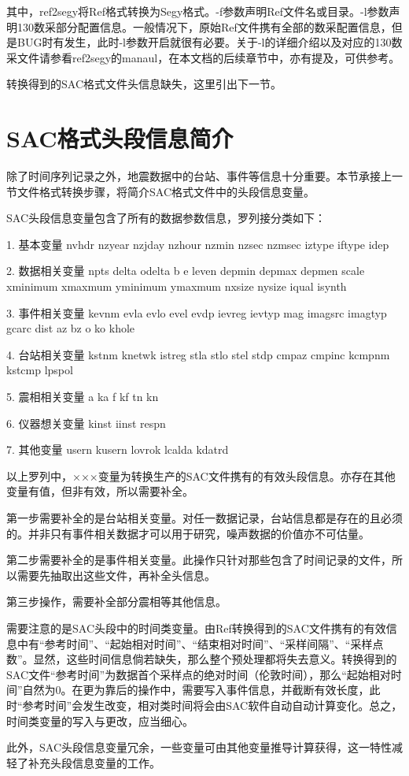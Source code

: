 \documentclass[a4paper]{article}
\begin{document}
其中，ref2segy将Ref格式转换为Segy格式。-f参数声明Ref文件名或目录。-l参数声明130数采部分配置信息。一般情况下，原始Ref文件携有全部的数采配置信息，但是BUG时有发生，此时-l参数开启就很有必要。关于-l的详细介绍以及对应的130数采文件请参看ref2segy的manaul，在本文档的后续章节中，亦有提及，可供参考。\par
转换得到的SAC格式文件头信息缺失，这里引出下一节。

\clearpage\section{SAC格式头段信息简介}
除了时间序列记录之外，地震数据中的台站、事件等信息十分重要。本节承接上一节文件格式转换步骤，将简介SAC格式文件中的头段信息变量。\par
SAC头段信息变量包含了所有的数据参数信息，罗列接分类如下：\par
1. 基本变量 nvhdr nzyear nzjday nzhour nzmin nzsec nzmsec iztype iftype idep\par
2. 数据相关变量 npts delta odelta b e leven depmin depmax depmen scale xminimum xmaxmum yminimum ymaxmum nxsize nysize iqual isynth\par
3. 事件相关变量 kevnm evla evlo evel evdp ievreg ievtyp mag imagsrc imagtyp gcarc dist az bz o ko khole\par
4. 台站相关变量 kstnm knetwk istreg stla stlo stel stdp cmpaz cmpinc kcmpnm kstcmp lpspol\par
5. 震相相关变量 a ka f kf tn kn\par
6. 仪器想关变量 kinst iinst respn\par
7. 其他变量 usern kusern lovrok lcalda kdatrd\par

以上罗列中，×××变量为转换生产的SAC文件携有的有效头段信息。亦存在其他变量有值，但非有效，所以需要补全。\par
第一步需要补全的是台站相关变量。对任一数据记录，台站信息都是存在的且必须的。并非只有事件相关数据才可以用于研究，噪声数据的价值亦不可估量。\par
第二步需要补全的是事件相关变量。此操作只针对那些包含了时间记录的文件，所以需要先抽取出这些文件，再补全头信息。\par
第三步操作，需要补全部分震相等其他信息。\par
需要注意的是SAC头段中的时间类变量。由Ref转换得到的SAC文件携有的有效信息中有“参考时间”、“起始相对时间”、“结束相对时间”、“采样间隔”、“采样点数”。显然，这些时间信息倘若缺失，那么整个预处理都将失去意义。转换得到的SAC文件“参考时间”为数据首个采样点的绝对时间（伦敦时间），那么“起始相对时间”自然为0。在更为靠后的操作中，需要写入事件信息，并截断有效长度，此时“参考时间”会发生改变，相对类时间将会由SAC软件自动自动计算变化。总之，时间类变量的写入与更改，应当细心。\par
此外，SAC头段信息变量冗余，一些变量可由其他变量推导计算获得，这一特性减轻了补充头段信息变量的工作。\par
\end{document}
